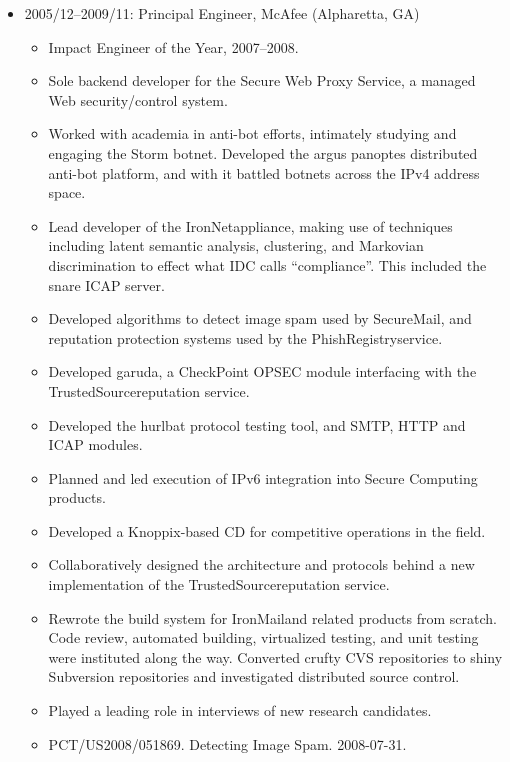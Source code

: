 \documentclass{article}
\newenvironment{tightitemize}
{\begin{itemize}
  \setlength{\itemsep}{1pt}
  \setlength{\parskip}{0pt}
  \setlength{\parsep}{0pt}}
{\end{itemize}}
\begin{document}
\begin{tightitemize}
\item 2005/12--2009/11: Principal Engineer, McAfee (Alpharetta, GA)

\begin{tightitemize}
\item Impact Engineer of the Year, 2007--2008.
\item Sole backend developer for the Secure Web Proxy Service, a managed Web
  security/control system.
\item Worked with academia in anti-bot efforts, intimately studying and engaging
  the Storm botnet. Developed the argus panoptes distributed anti-bot
  platform, and with it battled botnets across the IPv4 address space.
\item Lead developer of the IronNet\texttrademark appliance, making use of techniques
  including latent semantic analysis, clustering, and Markovian discrimination
  to effect what IDC calls ``compliance''. This included the snare ICAP server.
\item Developed algorithms to detect image spam used by SecureMail\texttrademark, and
  reputation protection systems used by the PhishRegistry\texttrademark service.
\item Developed garuda, a CheckPoint\textsuperscript{\textregistered} OPSEC module interfacing with the
  TrustedSource\texttrademark reputation service.
\item Developed the hurlbat protocol testing tool, and SMTP, HTTP and ICAP modules.
\item Planned and led execution of IPv6 integration into Secure Computing products.
\item Developed a Knoppix\textsuperscript{\textregistered}-based CD for competitive operations in the field.
\item Collaboratively designed the architecture and protocols behind a new
  implementation of the TrustedSource\texttrademark reputation service.
\item Rewrote the build system for IronMail\texttrademark and related products from scratch.
  Code review, automated building, virtualized testing, and unit testing were
  instituted along the way. Converted crufty CVS repositories to shiny
  Subversion repositories and investigated distributed source control.
\item Played a leading role in interviews of new research candidates.
\item PCT/US2008/051869. Detecting Image Spam. 2008-07-31.
\end{tightitemize}


\end{tightitemize}
\end{document}
